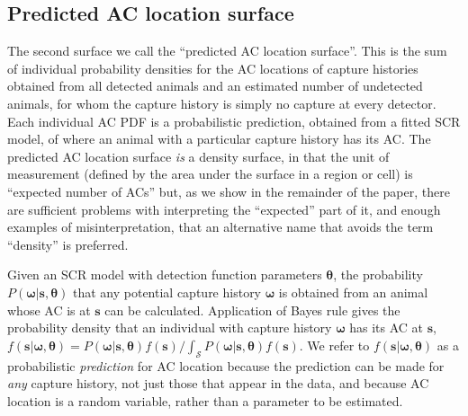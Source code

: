 \documentclass[useAMS,usenatbib,referee]{biom}
\begin{document}
\subsection{Predicted AC location surface} \label{s:racd}
 
The second surface we call the ``predicted AC location surface''. This is the sum of individual probability densities for the AC locations of capture histories obtained from all detected animals and an estimated number of undetected animals, for whom the capture history is simply no capture at every detector. Each individual AC PDF is a probabilistic prediction, obtained from a fitted SCR model, of where an animal with a particular capture history has its AC. The predicted AC location surface {\it is} a density surface, in that the unit of measurement (defined by the area under the surface in a region or cell) is ``expected number of ACs'' but, as we show in the remainder of the paper, there are sufficient problems with interpreting the ``expected'' part of it, and enough examples of misinterpretation, that an alternative name that avoids the term ``density'' is preferred. 


Given an SCR model with detection function parameters $\bm{\theta}$, the probability $P(\bm{\omega}|\bm{s},\bm{\theta})$ that any potential capture history $\bm{\omega}$ is obtained from an animal whose AC is at $\bm{s}$ can be calculated. Application of Bayes rule gives the probability density that an individual with capture history $\bm{\omega}$ has its AC at $\bm{s}$, $f(\bm{s}|\bm{\omega},\bm{\theta})=P(\bm{\omega}|\bm{s},\bm{\theta})f(\bm{s})/\int_{\mathcal{S}} P(\bm{\omega}|\bm{s},\bm{\theta})f(\bm{s})$. We refer to $f(\bm{s}|\bm{\omega},\bm{\theta})$ as a probabilistic {\it prediction} for AC location because the prediction can be made for {\it any} capture history, not just those that appear in the data, and because AC location is a random variable, rather than a parameter to be estimated. 

\end{document}
